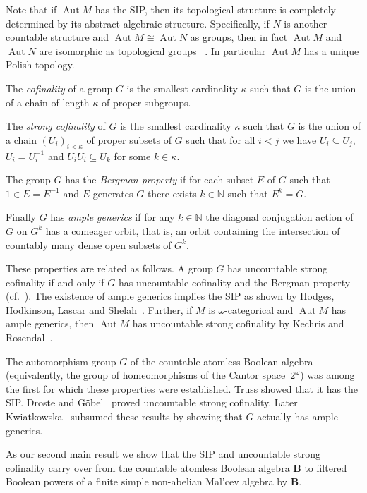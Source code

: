 \documentclass[12pt,a4paper,reqno]{amsart}
\numberwithin{equation}{section}
\theoremstyle{plain}
\theoremstyle{definition}
\newcommand{\B}{\mathbf{B}}
\newcommand{\N}{\mathbb{N}}
\DeclareMathOperator{\Aut}{Aut}
\begin{document}
 Note that if $\Aut M$ has the SIP, then its topological structure is completely determined by its abstract
 algebraic structure.
Specifically, if $N$ is another countable structure and $\Aut M\cong\Aut N$ as groups, then in fact $\Aut M$ and $\Aut N$ are isomorphic as topological groups ~\cite[Proposition 5.2.2]{Mac:SHS}.
 In particular $\Aut M$ has a unique Polish topology.

 The \emph{cofinality} of a group $G$ is the smallest cardinality $\kappa$ such that $G$ is the union of a chain of length
 $\kappa$ of proper subgroups. 

 The \emph{strong cofinality} of $G$ is the smallest cardinality $\kappa$ such that $G$ is the union of a chain
 $(U_i)_{i<\kappa}$ of proper subsets of $G$ such that for all $i<j$ we have $U_i\subseteq U_j$, 
 $U_i = U_i^{-1}$ and $U_iU_i \subseteq U_k$ for some $k\in\kappa$. 

 The group $G$ has the \emph{Bergman property} if for each subset $E$ of $G$ such that $1\in E = E^{-1}$ and
 $E$ generates $G$ there exists $k\in\N$ such that $E^k = G$.

 Finally $G$ has \emph{ample generics} if for any $k\in\N$ the diagonal conjugation action of $G$ on $G^k$
 has a comeager orbit, that is, an orbit containing the intersection of countably many dense open subsets of $G^k$.

 These properties are related as follows.
 A group $G$ has uncountable strong cofinality if and only if 
 $G$ has uncountable cofinality and the Bergman property
 (cf.~\cite[Theorem 2.2]{DH:GAG}).
 The existence of ample generics implies the SIP as shown by Hodges, Hodkinson, Lascar and Shelah~\cite{HHLS:SIP}.
 Further, if $M$ is $\omega$-categorical and $\Aut M$ has ample generics,
 then $\Aut M$ has uncountable strong cofinality by Kechris and Rosendal~\cite{KR:TAG}.

 The automorphism group $G$ of the countable atomless Boolean algebra
(equivalently, the group of homeomorphisms of the Cantor space~$2^\omega$)
 was among the first for which these
 properties were established. Truss \cite{Tr:IPG2} showed that it has the SIP. Droste and G\"obel~\cite{DG:UCPG}
 proved uncountable strong cofinality.
 Later Kwiatkowska~\cite{Kw:GHC} subsumed these results by showing that $G$ actually has ample generics.
 
 
 As our second main result we show that the SIP and uncountable strong cofinality carry over from the countable atomless Boolean algebra $\B$ to filtered Boolean powers of a finite simple non-abelian Mal'cev algebra by $\B$.
   
\end{document}
